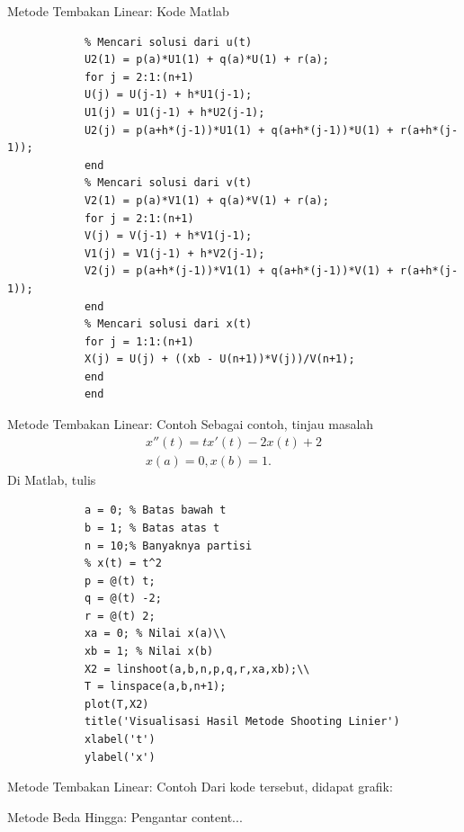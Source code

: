 \documentclass[xcolor={dvipsnames}, 9pt]{beamer}
\begin{document}
	\begin{frame}[fragile]{Metode Tembakan Linear: Kode Matlab}
		\begin{verbatim}
			% Mencari solusi dari u(t)
			U2(1) = p(a)*U1(1) + q(a)*U(1) + r(a);
			for j = 2:1:(n+1)
			U(j) = U(j-1) + h*U1(j-1);
			U1(j) = U1(j-1) + h*U2(j-1);
			U2(j) = p(a+h*(j-1))*U1(1) + q(a+h*(j-1))*U(1) + r(a+h*(j-1));
			end
			% Mencari solusi dari v(t)
			V2(1) = p(a)*V1(1) + q(a)*V(1) + r(a);
			for j = 2:1:(n+1)
			V(j) = V(j-1) + h*V1(j-1);
			V1(j) = V1(j-1) + h*V2(j-1);
			V2(j) = p(a+h*(j-1))*V1(1) + q(a+h*(j-1))*V(1) + r(a+h*(j-1));
			end
			% Mencari solusi dari x(t)
			for j = 1:1:(n+1)
			X(j) = U(j) + ((xb - U(n+1))*V(j))/V(n+1);
			end
			end
		\end{verbatim}
	\end{frame}
	\begin{frame}[fragile]{Metode Tembakan Linear: Contoh}
		Sebagai contoh, tinjau masalah
		\begin{align*}
			x''(t) = tx'(t) - 2x(t) + 2 \\
			x(a) = 0, x(b) = 1.
		\end{align*}
		Di Matlab, tulis
		\begin{verbatim}
			a = 0; % Batas bawah t
			b = 1; % Batas atas t
			n = 10;% Banyaknya partisi
			% x(t) = t^2
			p = @(t) t;
			q = @(t) -2;
			r = @(t) 2;
			xa = 0; % Nilai x(a)\\
			xb = 1; % Nilai x(b)
			X2 = linshoot(a,b,n,p,q,r,xa,xb);\\
			T = linspace(a,b,n+1);
			plot(T,X2)
			title('Visualisasi Hasil Metode Shooting Linier')
			xlabel('t')
			ylabel('x')
		\end{verbatim}
	\end{frame}
	\begin{frame}{Metode Tembakan Linear: Contoh}
		Dari kode tersebut, didapat grafik:
	\end{frame}
	\begin{frame}{Metode Beda Hingga: Pengantar}
		content...
	\end{frame}
\end{document}
